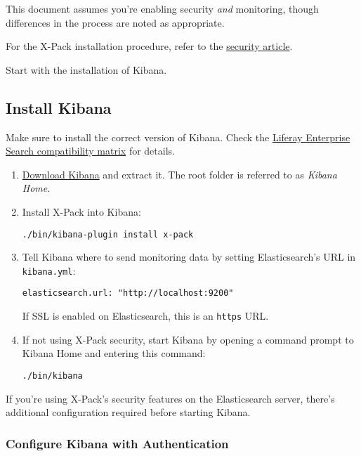 This document assumes you're enabling security \emph{and} monitoring,
though differences in the process are noted as appropriate.

For the X-Pack installation procedure, refer to the
\href{/docs/7-1/deploy/-/knowledge_base/d/installing-x-pack-security-6-1}{security
article}.

Start with the installation of Kibana.

\subsection{Install Kibana}\label{install-kibana-1}

Make sure to install the correct version of Kibana. Check the
\href{https://help.liferay.com/hc/en-us/articles/360016511651\#Liferay-Enterprise-Search}{Liferay
Enterprise Search compatibility matrix} for details.

\begin{enumerate}
\def\labelenumi{\arabic{enumi}.}
\item
  \href{https://www.elastic.co/downloads/kibana}{Download Kibana} and
  extract it. The root folder is referred to as \emph{Kibana Home}.
\item
  Install X-Pack into Kibana:

\begin{verbatim}
./bin/kibana-plugin install x-pack
\end{verbatim}
\item
  Tell Kibana where to send monitoring data by setting Elasticsearch's
  URL in \texttt{kibana.yml}:

\begin{verbatim}
elasticsearch.url: "http://localhost:9200"
\end{verbatim}

  If SSL is enabled on Elasticsearch, this is an \texttt{https} URL.
\item
  If not using X-Pack security, start Kibana by opening a command prompt
  to Kibana Home and entering this command:

\begin{verbatim}
./bin/kibana
\end{verbatim}
\end{enumerate}

If you're using X-Pack's security features on the Elasticsearch server,
there's additional configuration required before starting Kibana.

\subsubsection{Configure Kibana with
Authentication}\label{configure-kibana-with-authentication-1}

